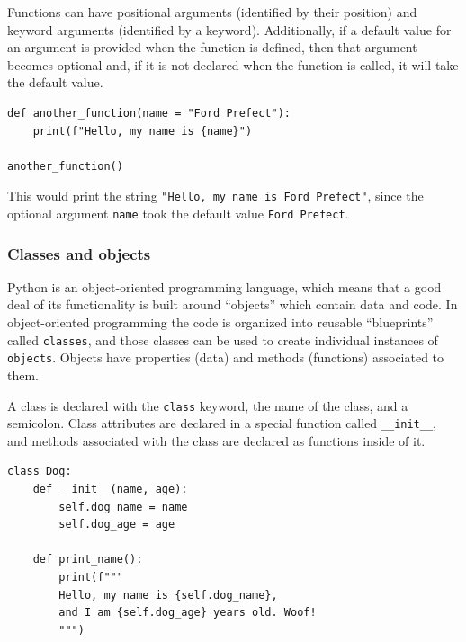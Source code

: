 \documentclass[a4paper,12pt]{article}
\begin{document}
Functions can have positional arguments (identified by their position) and keyword arguments (identified by a keyword). Additionally, if a default value for an argument is provided when the function is defined, then that argument becomes optional and, if it is not declared when the function is called, it will take the default value.

\begin{tcolorbox}[
    enhanced,
    attach boxed title to top left={xshift=6mm,yshift=-3mm},
    colback=lightgreen!20,
    colframe=lightgreen,
    colbacktitle=lightgreen,
    title=Python,
    fonttitle=\bfseries\color{black},
    boxed title style={size=small,colframe=lightgreen,sharp corners},
    sharp corners,
    ]
    \begin{verbatim}
def another_function(name = "Ford Prefect"):
    print(f"Hello, my name is {name}")

another_function()
    \end{verbatim}
\end{tcolorbox}

This would print the string \verb|"Hello, my name is Ford Prefect"|, since the optional argument \verb|name| took the default value \verb|Ford Prefect|.

\subsubsection{Classes and objects}

Python is an object-oriented programming language, which means that a good deal of its functionality is built around ``objects'' which contain data and code. In object-oriented programming the code is organized into reusable ``blueprints'' called \verb|classes|, and those classes can be used to create individual instances of \verb|objects|. Objects have properties (data) and methods (functions) associated to them.

A class is declared with the \verb|class| keyword, the name of the class, and a semicolon. Class attributes are declared in a special function called \verb|__init__|, and methods associated with the class are declared as functions inside of it.

\begin{tcolorbox}[
    enhanced,
    attach boxed title to top left={xshift=6mm,yshift=-3mm},
    colback=lightgreen!20,
    colframe=lightgreen,
    colbacktitle=lightgreen,
    title=Python,
    fonttitle=\bfseries\color{black},
    boxed title style={size=small,colframe=lightgreen,sharp corners},
    sharp corners,
    ]
    \begin{verbatim}
class Dog:
    def __init__(name, age):
        self.dog_name = name
        self.dog_age = age

    def print_name():
        print(f"""
        Hello, my name is {self.dog_name},
        and I am {self.dog_age} years old. Woof!
        """)
    \end{verbatim}
\end{tcolorbox}
\end{document}
